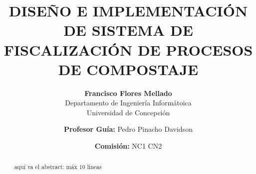 \documentclass[12pt, letterpaper]{article}
\begin{document}
\title{\bf DISEÑO E IMPLEMENTACIÓN DE SISTEMA DE FISCALIZACIÓN DE PROCESOS DE COMPOSTAJE}

\author{\textbf{Francisco Flores Mellado} \\ Departamento de Ingeniería Informátoica \\ Universidad de Concepción \\ \and \textbf{Profesor Guía:} Pedro Pinacho Davidson \and \textbf{Comisión:} NC1 CN2}

\maketitle

\begin{abstract}
aquí va el abstract: máx 10 lineas
\end{abstract}
\end{document}
